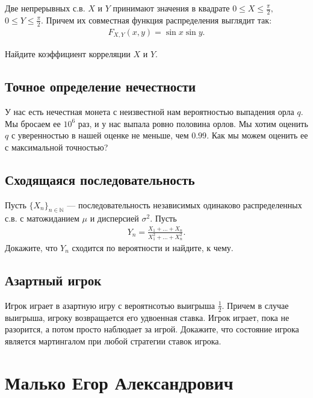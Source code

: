 \documentclass[12pt]{article}
\newcommand\N{\mathbb{N}}
\begin{document}
Две непрерывных с.в. $X$ и $Y$ принимают значения в квадрате $0 \le X \le \frac{\pi}{2},$ $0 \le Y \le \frac{\pi}{2}$. Причем их совместная функция распределения выглядит так:
\begin{align*}
    F_{X, Y} (x, y) = \sin x \sin y.
\end{align*}

Найдите коэффициент корреляции $X$ и $Y$.



\subsection{Точное определение нечестности}

У нас есть нечестная монета с неизвестной нам вероятностью выпадения орла $q$. Мы бросаем ее $10^6$ раз, и у нас выпала ровно половина орлов. Мы хотим оценить $q$ с уверенностью в нашей оценке не меньше, чем $0.99$. Как мы можем оценить ее с максимальной точностью? 



\subsection{Сходящаяся последовательность}

Пусть $\{X_n\}_{n \in \N}$ --- последовательность независимых одинаково распределенных с.в. с матожиданием $\mu$ и дисперсией $\sigma^2$. Пусть 
\begin{align*}
    Y_n = \frac{X_1 + \dots + X_n}{X_1^2 + \dots + X_n^2}.
\end{align*}
Докажите, что $Y_n$ сходится по вероятности и найдите, к чему.



\subsection{Азартный игрок}

Игрок играет в азартную игру с вероятнсотью выигрыша $\frac{1}{2}$. Причем в случае выигрыша, игроку возвращается его удвоенная ставка. Игрок играет, пока не разорится, а потом просто наблюдает за игрой. Докажите, что состояние игрока является мартингалом при любой стратегии ставок игрока.



\newpage
\section{Малько Егор Александрович}
\end{document}
